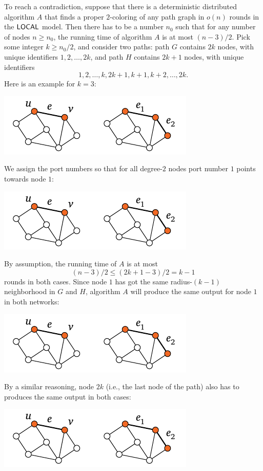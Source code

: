 To reach a contradiction, suppose that there is a deterministic distributed algorithm $A$ that finds a proper $2$-coloring of any path graph in $o(n)$ rounds in the $\textup{\sffamily LOCAL}$ model. Then there has to be a number $n_0$ such that for any number of nodes $n \ge n_0$, the running time of algorithm $A$ is at most $(n-3)/2$. Pick some integer $k \ge n_0/2$, and consider two paths: path $G$ contains $2k$ nodes, with unique identifiers $1,2,\dotsc,2k$, and path $H$ contains $2k+1$ nodes, with unique identifiers \[1,2,\dotsc,k,2k+1,k+1,k+2,\dotsc,2k.\] Here is an example for $k = 3$:
\begin{center}
    \includegraphics[page=\PIntroLbTwoA]{figs.pdf}
\end{center}
We assign the port numbers so that for all degree-$2$ nodes port number $1$ points towards node $1$:
\begin{center}
    \includegraphics[page=\PIntroLbTwoPN]{figs.pdf}
\end{center}
By assumption, the running time of $A$ is at most
\[
    (n-3)/2 \le (2k+1-3)/2 = k-1
\]
rounds in both cases. Since node $1$ has got the same radius-${(k-1)}$ neighborhood in $G$ and $H$, algorithm $A$ will produce the same output for node $1$ in both networks:
\begin{center}
    \includegraphics[page=\PIntroLbTwoB]{figs.pdf}
\end{center}
By a similar reasoning, node $2k$ (i.e., the last node of the path) also has to produces the same output in both cases:
\begin{center}
    \includegraphics[page=\PIntroLbTwoC]{figs.pdf}
\end{center}
